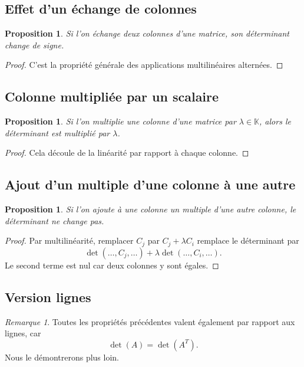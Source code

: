 \documentclass[11pt,a4paper]{article}
\newtheorem{proposition}[definition]{Proposition}
\theoremstyle{remark}
\newtheorem{remarque}[definition]{Remarque}
\newcommand{\K}{\mathbb{K}}
\begin{document}
\subsection{Effet d’un échange de colonnes}

\begin{proposition}
Si l’on échange deux colonnes d’une matrice, son déterminant change de signe.
\end{proposition}

\begin{proof}
C’est la propriété générale des applications multilinéaires alternées.
\end{proof}

\subsection{Colonne multipliée par un scalaire}

\begin{proposition}
Si l’on multiplie une colonne d’une matrice par \(\lambda\in\K\), alors le déterminant est multiplié par \(\lambda\).
\end{proposition}

\begin{proof}
Cela découle de la linéarité par rapport à chaque colonne.
\end{proof}

\subsection{Ajout d’un multiple d’une colonne à une autre}

\begin{proposition}
Si l’on ajoute à une colonne un multiple d’une autre colonne, le déterminant ne change pas.
\end{proposition}

\begin{proof}
Par multilinéarité, remplacer \(C_j\) par \(C_j+\lambda C_i\) remplace le déterminant par
\[
\det(\dots,C_j,\dots)+\lambda \det(\dots,C_i,\dots).
\]
Le second terme est nul car deux colonnes y sont égales.
\end{proof}

\subsection{Version lignes}

\begin{remarque}
Toutes les propriétés précédentes valent également par rapport aux lignes, car
\[
\det(A)=\det(A^T).
\]
Nous le démontrerons plus loin.
\end{remarque}
\end{document}
